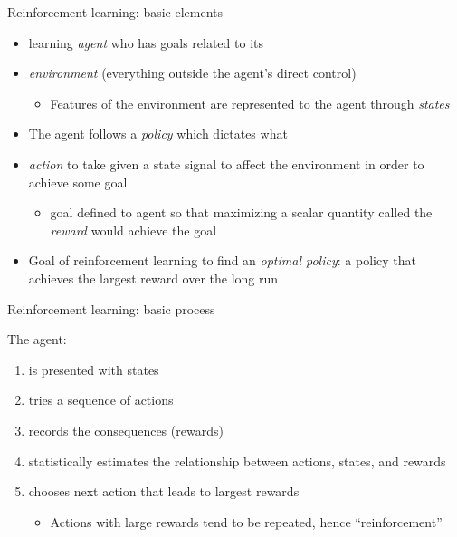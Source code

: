 \documentclass[handout]{beamer}
\begin{document}
\begin{frame}[c]{Reinforcement learning: basic elements}

\begin{itemize}[<+->]
  \item learning \emph{agent} who has goals related to its
  \item \emph{environment} (everything outside the agent's direct control)
  \begin{itemize}
    \item Features of the environment are represented to the agent through \emph{states}
  \end{itemize}
  \item The agent follows a \emph{policy} which dictates what 
  \item \emph{action} to take given a state signal to affect the environment in order to achieve some goal
  \begin{itemize}
    \item goal defined to agent so that maximizing a scalar quantity called the \emph{reward} would achieve the goal
  \end{itemize}
  \item Goal of reinforcement learning to find an \emph{optimal policy}: a policy that achieves the largest reward over the long run 
\end{itemize}

\end{frame}

\begin{frame}[c]{Reinforcement learning: basic process}

The agent:
\begin{enumerate}[<+->]
  \item is presented with states
  \item tries a sequence of actions
  \item records the consequences (rewards)
  \item statistically estimates the relationship between actions, states, and rewards
  \item chooses next action that leads to largest rewards
  \begin{itemize}
    \item Actions with large rewards tend to be repeated, hence ``reinforcement''
  \end{itemize}
\end{enumerate}
\end{frame}
\end{document}
